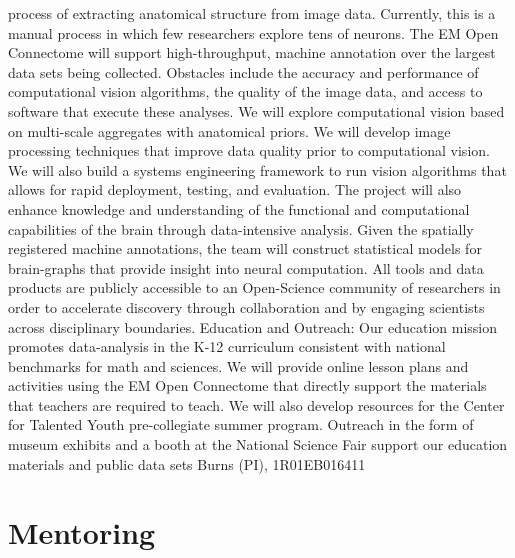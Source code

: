 \documentclass[10pt,colorlinks=true,urlcolor=blue]{moderncv}
\begin{document}
{process of extracting anatomical structure from image data. Currently, this is
a manual process in which few researchers explore tens of neurons. The EM Open
Connectome will support high-throughput, machine annotation over the largest
data sets being collected. Obstacles include the accuracy and performance of
computational vision algorithms, the quality of the image data, and access to
software that execute these analyses. We will explore computational vision
based on multi-scale aggregates with anatomical priors. We will develop image
processing techniques that improve data quality prior to computational vision.
We will also build a systems engineering framework to run vision algorithms
that allows for rapid deployment, testing, and evaluation. The project will
also enhance knowledge and understanding of the functional and computational
capabilities of the brain through data-intensive analysis. Given the spatially
registered machine annotations, the team will construct statistical models for
brain-graphs that provide insight into neural computation. All tools and data
products are publicly accessible to an Open-Science community of researchers in
order to accelerate discovery through collaboration and by engaging scientists
across disciplinary boundaries. Education and Outreach: Our education mission
promotes data-analysis in the K-12 curriculum consistent with national
benchmarks for math and sciences. We will provide online lesson plans and
activities using the EM Open Connectome that directly support the materials
that teachers are required to teach. We will also develop resources for the
Center for Talented Youth pre-collegiate summer program. Outreach in the form
of museum exhibits and a booth at the National Science Fair support our
education materials and public data sets%
	}
	{Burns (PI), 1R01EB016411}{}










\section{Mentoring}
\end{document}
